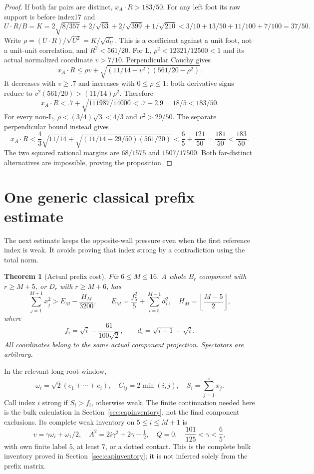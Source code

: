 \documentclass[11pt]{article}
\newtheorem{theorem}{Theorem}[section]
\theoremstyle{remark}
\begin{document}
\begin{proof}
If both far pairs are distinct, \(x_A\cdot R>183/50\).
For any left foot its raw support is before index17 and
\[
 U\cdot R/B
 =K=2\sqrt{8/357}+2/\sqrt{63}+2/\sqrt{399}+1/\sqrt{210}
 <3/10+13/50+11/100+7/100=37/50.
\]
Write \(\rho=(U\cdot R)/\sqrt{U^2}=K/\sqrt{d_U}\).
This is a coefficient against a unit foot, not a unit-unit
correlation, and \(R^2<561/20\).
For L, \(\rho^2<12321/12500<1\) and its actual normalized
coordinate \(v>7/10\). Perpendicular Cauchy gives
\[
 x_A\cdot R\le
 \rho v+\sqrt{(11/14-v^2)(561/20-\rho^2)}.
\]
It decreases with \(v\ge.7\) and increases with \(0\le\rho\le1\):
both derivative signs reduce to
\(v^2(561/20)>(11/14)\rho^2\). Therefore
\[
 x_A\cdot R<
 .7+\sqrt{111987/14000}<.7+2.9=18/5<183/50 .
\]
For every non-L, \(\rho<(3/4)\sqrt3<4/3\) and \(v^2>29/50\).
The separate perpendicular bound instead gives
\[
 x_A\cdot R<
 \frac43\sqrt{11/14}+
       \sqrt{(11/14-29/50)(561/20)}
 <\frac65+\frac{121}{50}=\frac{181}{50}<\frac{183}{50}.
\]
The two squared rational margins are \(68/1575\) and
\(1507/17500\). Both far-distinct alternatives are impossible,
proving the proposition.
\end{proof}

\section{One generic classical prefix estimate}\label{sec:prefix}

The next estimate keeps the opposite-wall pressure even when the
first reference index is weak. It avoids proving that index strong
by a contradiction using the total norm.

\begin{theorem}[Actual prefix cost]\label{thm:prefix}
Fix \(6\le M\le16\). A whole \(B_r\) component with \(r\ge M+5\),
or \(D_r\) with \(r\ge M+6\), has
\[
 \sum_{j=1}^{M+1}x_j^2>E_M-\frac{H_M}{3200},\qquad
 E_M=\frac{f_5^2}{5}+\sum_{i=5}^{M-1}d_i^2,\quad
 H_M=\left\lfloor\frac{M-5}{2}\right\rfloor,
\]
where
\[
 f_i=\sqrt i-\frac{61}{100\sqrt2},\qquad
 d_i=\sqrt{i+1}-\sqrt i .
\]
All coordinates belong to the same actual component projection.
Spectators are arbitrary.
\end{theorem}

In the relevant long-root window,
\[
 \omega_i=\sqrt2(e_1+\cdots+e_i),\quad
 C_{ij}=2\min(i,j),\quad S_i=\sum_{j=1}^ix_j .
\]
Call index \(i\) strong if \(S_i>f_i\), otherwise weak.
The finite continuation needed here is the bulk calculation in
Section~\ref{sec:capinventory}, not the final component exclusions.
Its complete weak
inventory on \(5\le i\le M+1\) is
\begin{equation}\label{eq:weak}
 v=\gamma\omega_i+\omega_1/2,\quad
 A^2=2i\gamma^2+2\gamma-\tfrac12,\quad Q=0,\quad
 \frac{101}{125}<\gamma<\frac65 ,
\end{equation}
with own finite label \(5\), at least \(7\), or a dotted contact.
This is the complete bulk inventory proved in
Section~\ref{sec:capinventory}; it is not inferred solely from the
prefix matrix.
\end{document}
